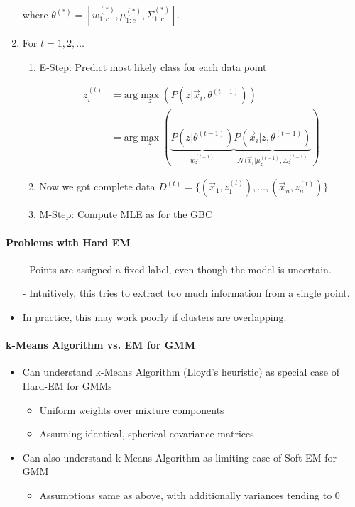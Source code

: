 \documentclass[8pt,a4paper]{scrartcl}
\newcommand{\Argmax}[2]{\text{arg}\underset{#1}{\max}\left(#2\right)}
\begin{document}
\begin{multicols*}{3}
\begin{enumerate}
where $\theta^{(\ast)}=\left[w_{1:c}^{(\ast)},\mu_{1:c}^{(\ast)},\Sigma_{1:c}^{(\ast)}\right]$.
\item For $t=1,2,\ldots$
\begin{enumerate}
\ncompaq
\item E-Step: Predict most likely class for each data point

\begin{align*}
z_i^{(t)}&=\Argmax{z}{P(z|\vec{x}_i,\theta^{(t-1)})}\\
&=\Argmax{z}{\underbrace{P(z|\theta^{(t-1)})}_{w_z^{(t-1)}}\underbrace{P(\vec{x}_i|z,\theta^{(t-1)})}_{\mathcal{N}(\vec{x}_i|\mu_z^{(t-1)},\Sigma_z^{(t-1)}}}
\end{align*}
\item Now we got complete data $D^{(t)}=\{(\vec{x}_1,z_1^{(t)}),\ldots,(\vec{x}_n,z_n^{(t)})\}$
\item M-Step: Compute MLE as for the GBC

\mportant{$\theta^{(t)}=\Argmax{\theta}{P(D^{(t)}|\theta)}$}
\end{enumerate}
\end{enumerate}

\paragraph{Problems with Hard EM}

\begin{itemize}
\ncompaq
\item[-] Points are assigned a fixed label, even though the model is uncertain.
\item[-] Intuitively, this tries to extract too much information from a single point.
\item In practice, this may work poorly if clusters are overlapping.
\end{itemize}

\paragraph{k-Means Algorithm vs. EM for GMM}

\begin{itemize}
\ncompaq
\item Can understand k-Means Algorithm (Lloyd's heuristic) as special case of Hard-EM for GMMs
\begin{itemize}
\ncompaq
\item Uniform weights over mixture components
\item Assuming identical, spherical covariance matrices
\end{itemize}
\item Can also understand k-Means Algorithm as limiting case of Soft-EM for GMM
\begin{itemize}
\ncompaq
\item Assumptions same as above, with additionally variances tending to 0
\end{itemize}
\end{itemize}


\end{multicols*}
\end{document}
